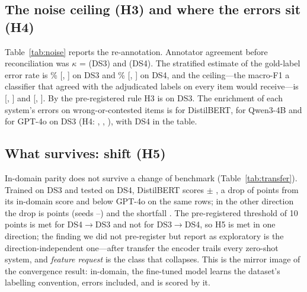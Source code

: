 \documentclass[sigconf,anonymous,review]{acmart}
\newcommand{\fone}{macro-F1\xspace}
\begin{document}
\subsection{The noise ceiling (H3) and where the errors sit (H4)}
\begin{table}[t]
\caption{Blind stratified re-annotation: agreement, estimated gold-label error rate, the ceiling it implies, and the enrichment of each system's errors on items whose gold label is wrong or contested.}
\label{tab:noise}
\centering\footnotesize\setlength{\tabcolsep}{3.5pt}

\end{table}
Table~\ref{tab:noise} reports the re-annotation. Annotator agreement before reconciliation was $\kappa$ = \kappaBeforeDSthree{} (DS3) and \kappaBeforeDSfour{} (DS4). The stratified estimate of the gold-label error rate is \epsDSthree\% [\epsLoDSthree, \epsHiDSthree] on DS3 and \epsDSfour\% [\epsLoDSfour, \epsHiDSfour] on DS4, and the ceiling---the \fone a classifier that agreed with the adjudicated labels on every item would receive---is \ceilingDSthree{} [\ceilingLoDSthree, \ceilingHiDSthree] and \ceilingDSfour{} [\ceilingLoDSfour, \ceilingHiDSfour]. By the pre-registered rule H3 is \hThreeVerdictDSthree{} on DS3. The enrichment of each system's errors on wrong-or-contested items is \rrFoneDSthree{} for DistilBERT, \rrFtwoDSthree{} for Qwen3-4B and \rrFthreeDSthree{} for GPT-4o on DS3 (H4: \hFourVerdictFoneDSthree, \hFourVerdictFtwoDSthree, \hFourVerdictFthreeDSthree), with DS4 in the table.

\subsection{What survives: shift (H5)}
\begin{table}[t]
\caption{Cross-dataset transfer of DistilBERT (mean $\pm$ s.d.\ over three seeds, single-label view), the drop from its in-domain out-of-fold score on the same test set (Table~\ref{tab:main}), GPT-4o on the same rows, and per-class F1 after transfer.}
\label{tab:transfer}
\centering\footnotesize\setlength{\tabcolsep}{3pt}

\end{table}
In-domain parity does not survive a change of benchmark (Table~\ref{tab:transfer}). Trained on DS3 and tested on DS4, DistilBERT scores \transferDSthreeToDSfour{} $\pm$ \transferSdDSthreeToDSfour, a drop of \dropDSthreeToDSfour{} points from its in-domain score and \belowGptDSthreeToDSfour{} below GPT-4o on the same rows; in the other direction the drop is \dropDSfourToDSthree{} points (seeds \dropMinDSfourToDSthree--\dropMaxDSfourToDSthree) and the shortfall \belowGptDSfourToDSthree. The pre-registered threshold of 10 points is met for DS4$\rightarrow$DS3 and not for DS3$\rightarrow$DS4, so H5 is met in one direction; the finding we did not pre-register but report as exploratory is the direction-independent one---after transfer the encoder trails every zero-shot system, and \emph{feature request} is the class that collapses. This is the mirror image of the convergence result: in-domain, the fine-tuned model learns the dataset's labelling convention, errors included, and is scored by it.
\end{document}
